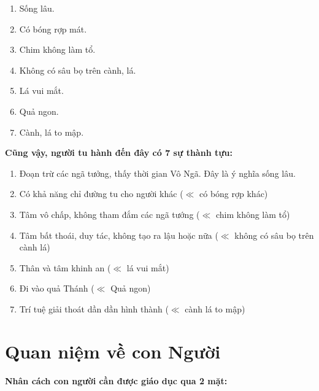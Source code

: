 \begin{enumerate}[label=\itshape\arabic*\upshape)]

    \item Sống lâu.

    \item Có bóng rợp mát.

    \item Chim không làm tổ.

    \item Không có sâu bọ trên cành, lá.

    \item Lá vui mắt.

    \item Quả ngon.

    \item Cành, lá to mập.
\end{enumerate}

{\bf Cũng vậy, người tu hành đến đây có 7 sự thành tựu:}

\begin{enumerate}[label=\itshape\arabic*\upshape)]
    \item Đoạn trừ các ngã tưởng, thấy thời gian Vô Ngã. Đây là ý nghĩa sống lâu.

    \item Có khả năng chỉ đường tu cho người khác ($\ll$ có bóng rợp khác)

    \item Tâm vô chấp, không tham đắm các ngã tướng ($\ll$ chim không làm tổ)

    \item Tâm bất thoái, duy tác, không tạo ra lậu hoặc nữa ($\ll$ không có sâu bọ trên cành lá)

    \item Thân và tâm khinh an ($\ll$ lá vui mắt)

    \item Đi vào quả Thánh ($\ll$ Quả ngon)

    \item Trí tuệ giải thoát dần dần hình thành ($\ll$ cành lá to mập)
\end{enumerate}

\section{Quan niệm về con Người} %
\label{sec:67_con_nguoi}

{\bf Nhân cách con người cần được giáo dục qua 2 mặt:}

